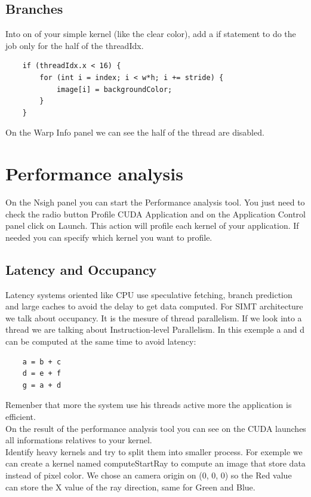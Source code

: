 \documentclass{article}
\begin{document}
\subsection{Branches}
Into on of your simple kernel (like the clear color), add a if statement to do the job only for the half of the threadIdx.
\begin{lstlisting}
	if (threadIdx.x < 16) {
		for (int i = index; i < w*h; i += stride) {
			image[i] = backgroundColor;
		}
	}
\end{lstlisting}
On the Warp Info panel we can see the half of the thread are disabled.

\section{Performance analysis}
On the Nsigh panel you can start the Performance analysis tool. You just need to check the radio button Profile CUDA Application and on the Application Control panel click on Launch. This action will profile each kernel of your application. If needed you can specify which kernel you want to profile.\\
\subsection{Latency and Occupancy}
Latency systems oriented like CPU use speculative fetching, branch prediction and large caches to avoid the delay to get data computed. For SIMT architecture we talk about  occupancy. It is the mesure of thread parallelism. If we look into a thread we are talking about Instruction-level Parallelism. In this exemple a and d can be computed at the same time to avoid latency:
\begin{lstlisting}
	a = b + c
	d = e + f
	g = a + d
\end{lstlisting}
Remenber that more the system use his threads active more the application is efficient.\\
On the result of the performance analysis tool you can see on the CUDA launches all informations relatives to your kernel.\\
Identify heavy kernels and try to split them into smaller process. For exemple we can create a kernel named computeStartRay to compute an image that store data instead of pixel color. We chose an camera origin on (0, 0, 0) so the Red value can store the X value of the ray direction, same for Green and Blue.
\end{document}
